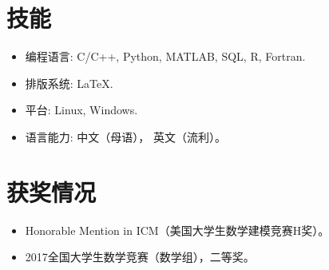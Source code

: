 \documentclass[11pt]{article}
\begin{document}
\section{\textbf{技能}}
\begin{itemize} [parsep=1ex]
    \item 编程语言: C/C++, Python, MATLAB, SQL, R, Fortran.
    \item 排版系统: \LaTeX.
    \item 平台: Linux, Windows.
    \item 语言能力: 中文（母语）， 英文（流利）。
\end{itemize}

\section{\textbf{获奖情况}}
\begin{itemize} [parsep=1ex]
    \item Honorable Mention in ICM（美国大学生数学建模竞赛H奖）。
    \item 2017全国大学生数学竞赛（数学组），二等奖。
\end{itemize}
\end{document}
